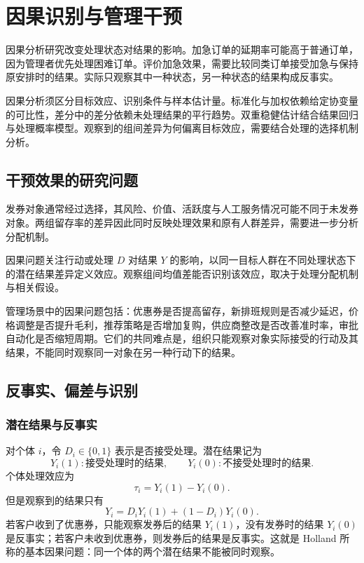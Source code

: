 \chapter{因果识别与管理干预}
\label{ch:week08-causality}

因果分析研究改变处理状态对结果的影响。加急订单的延期率可能高于普通订单，
因为管理者优先处理困难订单。评价加急效果，需要比较同类订单接受加急与保持
原安排时的结果。实际只观察其中一种状态，另一种状态的结果构成反事实。

因果分析须区分目标效应、识别条件与样本估计量。标准化与加权依赖给定协变量
的可比性，差分中的差分依赖未处理结果的平行趋势。双重稳健估计结合结果回归
与处理概率模型。观察到的组间差异为何偏离目标效应，需要结合处理的选择机制分析。

\section{干预效果的研究问题}

发券对象通常经过选择，其风险、价值、活跃度与人工服务情况可能不同于未发券对象。两组留存率的差异因此同时反映处理效果和原有人群差异，需要进一步分析分配机制。

\begin{definition}[因果问题]
因果问题关注行动或处理 \(D\) 对结果 \(Y\) 的影响，以同一目标人群在不同处理状态下的潜在结果差异定义效应。观察组间均值差能否识别该效应，取决于处理分配机制与相关假设。
\end{definition}

管理场景中的因果问题包括：优惠券是否提高留存，新排班规则是否减少延迟，价格调整是否提升毛利，推荐策略是否增加复购，供应商整改是否改善准时率，审批自动化是否缩短周期。它们的共同难点是，组织只能观察对象实际接受的行动及其结果，不能同时观察同一对象在另一种行动下的结果。

\section{反事实、偏差与识别}
\subsection{潜在结果与反事实}

对个体 \(i\)，令 \(D_i\in\{0,1\}\) 表示是否接受处理。潜在结果记为
\[
  Y_i(1):\text{接受处理时的结果},
  \qquad
  Y_i(0):\text{不接受处理时的结果}.
\]
个体处理效应为
\[
  \tau_i=Y_i(1)-Y_i(0).
\]
但是观察到的结果只有
\[
  Y_i=D_iY_i(1)+(1-D_i)Y_i(0).
\]
若客户收到了优惠券，只能观察发券后的结果 \(Y_i(1)\)，没有发券时的结果 \(Y_i(0)\) 是反事实；若客户未收到优惠券，则发券后的结果是反事实。这就是 Holland 所称的基本因果问题：同一个体的两个潜在结果不能被同时观察。

